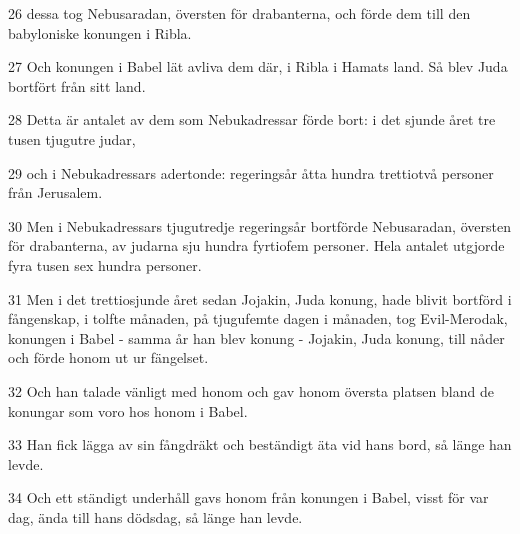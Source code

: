 \par 26 dessa tog Nebusaradan, översten för drabanterna, och förde dem till den babyloniske konungen i Ribla.
\par 27 Och konungen i Babel lät avliva dem där, i Ribla i Hamats land. Så blev Juda bortfört från sitt land.
\par 28 Detta är antalet av dem som Nebukadressar förde bort: i det sjunde året tre tusen tjugutre judar,
\par 29 och i Nebukadressars adertonde: regeringsår åtta hundra trettiotvå personer från Jerusalem.
\par 30 Men i Nebukadressars tjugutredje regeringsår bortförde Nebusaradan, översten för drabanterna, av judarna sju hundra fyrtiofem personer. Hela antalet utgjorde fyra tusen sex hundra personer.
\par 31 Men i det trettiosjunde året sedan Jojakin, Juda konung, hade blivit bortförd i fångenskap, i tolfte månaden, på tjugufemte dagen i månaden, tog Evil-Merodak, konungen i Babel - samma år han blev konung - Jojakin, Juda konung, till nåder och förde honom ut ur fängelset.
\par 32 Och han talade vänligt med honom och gav honom översta platsen bland de konungar som voro hos honom i Babel.
\par 33 Han fick lägga av sin fångdräkt och beständigt äta vid hans bord, så länge han levde.
\par 34 Och ett ständigt underhåll gavs honom från konungen i Babel, visst för var dag, ända till hans dödsdag, så länge han levde.


